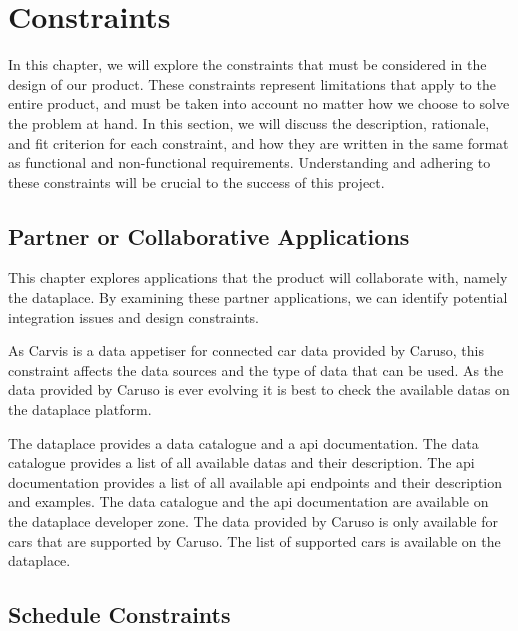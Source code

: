 \chapter{Constraints}

In this chapter, we will explore the constraints that must be considered in the design of our product. These constraints represent limitations that apply to the entire product, and must be taken into account no matter how we choose to solve the problem at hand. In this section, we will discuss the description, rationale, and fit criterion for each constraint, and how they are written in the same format as functional and non-functional requirements. Understanding and adhering to these constraints will be crucial to the success of this project.

\section{Partner or Collaborative Applications}

This chapter explores applications that the product will collaborate with, namely the \gls{dataplace}. By examining these partner applications, we can identify potential integration issues and design constraints.

As Carvis is a data appetiser for connected car data provided by Caruso, this constraint affects the data sources and the type of data that can be used. As the data provided by Caruso is ever evolving it is best to check the available \glspl{data} on the \gls{dataplace} platform. 

The \gls{dataplace} provides a data catalogue and a \gls{api} documentation. The data catalogue provides a list of all available \glspl{data} and their description. The \gls{api} documentation provides a list of all available \gls{api} endpoints and their description and examples. The data catalogue and the \gls{api} documentation are available on the \gls{dataplace} developer zone. The data provided by Caruso is only available for cars that are supported by Caruso. The list of supported cars is available on the \gls{dataplace}.

\section{Schedule Constraints}

